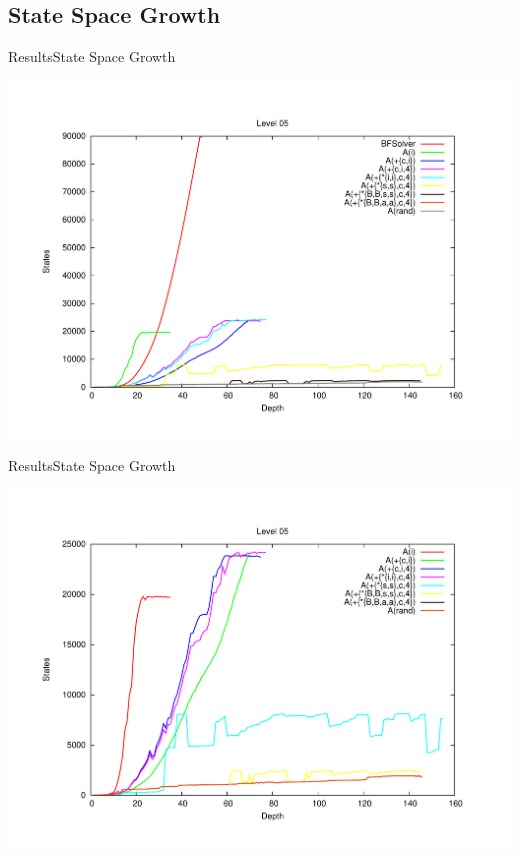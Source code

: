 \subsection{State Space Growth}
\begin{frame}{Results}{State Space Growth}
  \vspace{-1cm}
  \begin{center}
    \includegraphics[height=0.93\textheight]{statespace1}
  \end{center}
\end{frame}

\begin{frame}{Results}{State Space Growth}
  \vspace{-1cm}
  \begin{center}
    \includegraphics[height=0.93\textheight]{statespace2}
  \end{center}
\end{frame}


